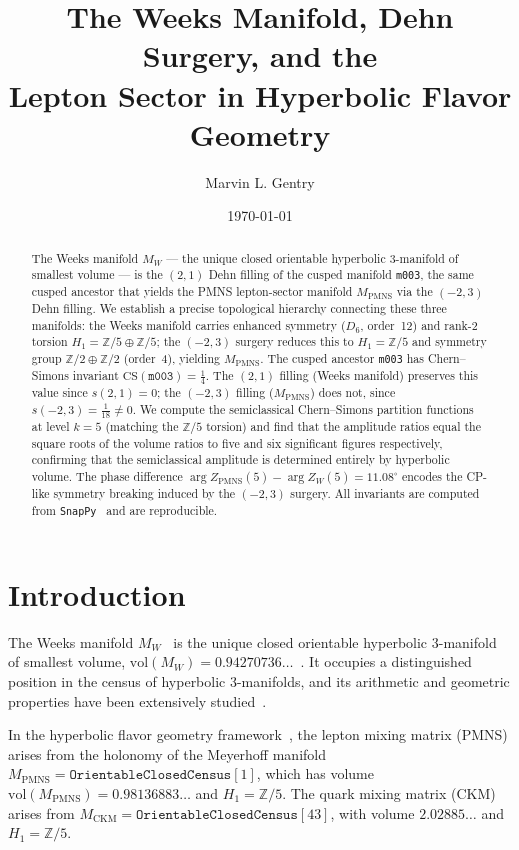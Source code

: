 \documentclass[12pt]{article}
\title{The Weeks Manifold, Dehn Surgery, and the\\
Lepton Sector in Hyperbolic Flavor Geometry}
\author[1]{Marvin L. Gentry}
\affil[1]{Independent Researcher, \texttt{drmlgentry@protonmail.com}\\
ORCID: 0009-0006-4550-2663}
\date{\today}
\theoremstyle{definition}
\begin{document}
\maketitle

\begin{abstract}
The Weeks manifold $M_W$ --- the unique closed orientable hyperbolic
3-manifold of smallest volume --- is the $(2,1)$ Dehn filling of the
cusped manifold \texttt{m003}, the same cusped ancestor that yields the
PMNS lepton-sector manifold $M_\mathrm{PMNS}$ via the $(-2,3)$ Dehn
filling. We establish a precise topological hierarchy connecting these
three manifolds: the Weeks manifold carries enhanced symmetry
($D_6$, order~12) and rank-2 torsion $H_1 = \mathbb{Z}/5\oplus
\mathbb{Z}/5$; the $(-2,3)$ surgery reduces this to $H_1 =\mathbb{Z}/5$
and symmetry group $\mathbb{Z}/2\oplus\mathbb{Z}/2$ (order~4), yielding
$M_\mathrm{PMNS}$. The cusped ancestor \texttt{m003} has Chern--Simons invariant $\mathrm{CS}(\texttt{m003})=\tfrac{1}{4}$.
The $(2,1)$ filling (Weeks manifold) preserves this value since $s(2,1)=0$;
the $(-2,3)$ filling ($M_{\mathrm{PMNS}}$) does not, since $s(-2,3)=\tfrac{1}{18}\neq 0$.
We compute the semiclassical Chern--Simons partition functions at level
$k=5$ (matching the $\mathbb{Z}/5$ torsion) and find that the amplitude
ratios equal the square roots of the volume ratios to five and six
significant figures respectively, confirming that the semiclassical
amplitude is determined entirely by hyperbolic volume. The phase
difference $\arg Z_\mathrm{PMNS}(5) - \arg Z_W(5) = 11.08^\circ$
encodes the CP-like symmetry breaking induced by the $(-2,3)$ surgery.
All invariants are computed from \texttt{SnapPy}~\cite{SnapPy} and are
reproducible.
\end{abstract}

\section{Introduction}
\label{sec:intro}

The Weeks manifold $M_W$~\cite{Weeks1985} is the unique closed
orientable hyperbolic 3-manifold of smallest volume,
$\mathrm{vol}(M_W) = 0.94270736\ldots$~\cite{Gabai2009}. It occupies
a distinguished position in the census of hyperbolic 3-manifolds, and
its arithmetic and geometric properties have been extensively
studied~\cite{Chinburg98}.

In the hyperbolic flavor geometry framework~\cite{Gentry:CKM,
Gentry:PMNS,Gentry:CP}, the lepton mixing matrix (PMNS) arises from the
holonomy of the Meyerhoff manifold $M_\mathrm{PMNS} =
\texttt{OrientableClosedCensus}[1]$, which has volume
$\mathrm{vol}(M_\mathrm{PMNS}) = 0.98136883\ldots$ and $H_1 =
\mathbb{Z}/5$. The quark mixing matrix (CKM) arises from
$M_\mathrm{CKM} = \texttt{OrientableClosedCensus}[43]$, with volume
$2.02885\ldots$ and $H_1 = \mathbb{Z}/5$.
\end{document}
